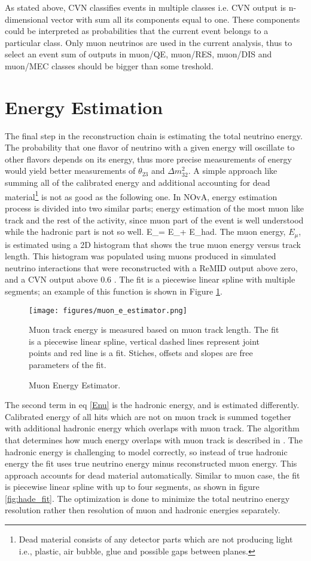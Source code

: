 As stated above, CVN classifies events in multiple classes i.e. CVN output is n-dimensional vector with sum all its 
components equal to one. These components could be interpreted as probabilities that the current event belongs 
to a particular class. Only muon neutrinos are used in the current analysis, thus to select an event sum of outputs 
in muon/QE, muon/RES, muon/DIS and muon/MEC classes should be bigger than some treshold.

\section{Energy Estimation} \label{energy_est_cont}
The final step in the reconstruction chain is estimating the total neutrino energy. The probability that one
flavor of neutrino with a given energy will oscillate to other flavors depends on its energy, thus more
precise measurements of energy would yield better measurements of $\theta_{23}$ and $\Delta m_{32}^2$.
A simple approach like summing all of the calibrated energy and additional accounting for dead 
material\footnote{Dead material consists of any detector parts which are not producing light i.e., plastic, air 
bubble, glue and possible gaps between planes.} is not as good as the following one. In NOvA, energy estimation 
process is divided into two similar parts; energy estimation of the most muon like track and the rest of the 
activity, since muon part of the event is well understood while the hadronic part is not so well.
\be
E_\nu = E_\mu + E_{had}.
\ee 
The muon energy, $E_{\mu}$, is estimated using a 2D histogram that shows the true muon energy versus track length.
This histogram was populated using muons produced in simulated neutrino interactions that were reconstructed with
a ReMID output above zero, and a CVN output above 0.6 \cite{energy_technote}. The fit is a piecewise linear spline
with multiple segments; an example of this function is shown in Figure \ref{fig:mue_fit}.
\begin{figure}[t]
\texttt{[image: figures/muon\_e\_estimator.png]}
\centering
\caption{Muon Energy Estimator.}
{Muon track energy is measured based on muon track length. The fit is a piecewise linear spline, vertical dashed
lines represent joint points and red line is a fit. Stiches, offsets and slopes are free parameters of the fit.}
\label{fig:mue_fit}
\end{figure}

The second term in eq \ref{Enu} is the hadronic energy, and is estimated differently. Calibrated energy of all hits 
which are not on muon track is summed together with additional hadronic energy which overlaps with muon track. 
The algorithm that determines how much energy overlaps with muon track is described in \cite{Kanika}. The hadronic
energy is challenging to model correctly, so instead of true hadronic energy the fit uses true neutrino energy minus
reconstructed muon energy. This approach accounts for dead material automatically. Similar to muon case, the fit 
is piecewise linear spline with up to four segments, as shown in figure \ref{fig:hade_fit}. The optimization is done
to minimize the total neutrino energy resolution rather then resolution of muon and hadronic energies separately. 

